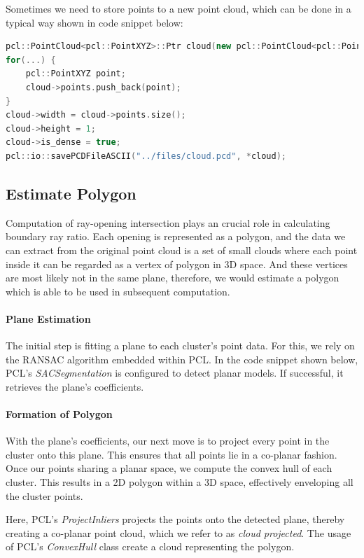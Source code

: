 \documentclass[11pt, a4paper,oneside,chapterprefix=false]{scrbook}
\begin{document}
Sometimes we need to store points to a new point cloud, which can be done in a typical way shown in code snippet below:

\begin{lstlisting}[language=C++, caption=Save Point Cloud Data]
pcl::PointCloud<pcl::PointXYZ>::Ptr cloud(new pcl::PointCloud<pcl::PointXYZ>);
for(...) {
    pcl::PointXYZ point;
    cloud->points.push_back(point);
}
cloud->width = cloud->points.size();
cloud->height = 1;
cloud->is_dense = true;
pcl::io::savePCDFileASCII("../files/cloud.pcd", *cloud);
\end{lstlisting}

\subsection{Estimate Polygon}

Computation of ray-opening intersection plays an crucial role in calculating boundary ray ratio. Each opening is represented as a polygon, and the data we can extract from the original point cloud is a set of small clouds where each point inside it can be regarded as a vertex of polygon in 3D space. And these vertices are most likely not in the same plane, therefore, we would estimate a polygon which is able to be used in subsequent computation. 

\paragraph{Plane Estimation}

The initial step is fitting a plane to each cluster's point data. For this, we rely on the RANSAC algorithm embedded within PCL. In the code snippet shown below, PCL's \emph{SACSegmentation} is configured to detect planar models. If successful, it retrieves the plane's coefficients.

\paragraph{Formation of Polygon}

With the plane's coefficients, our next move is to project every point in the cluster onto this plane. This ensures that all points lie in a co-planar fashion. Once our points sharing a planar space, we compute the convex hull of each cluster. This results in a 2D polygon within a 3D space, effectively enveloping all the cluster points.

Here, PCL's \emph{ProjectInliers} projects the points onto the detected plane, thereby creating a co-planar point cloud, which we refer to as \emph{cloud projected}. The usage of PCL's \emph{ConvexHull} class create a cloud representing the polygon.
\end{document}
